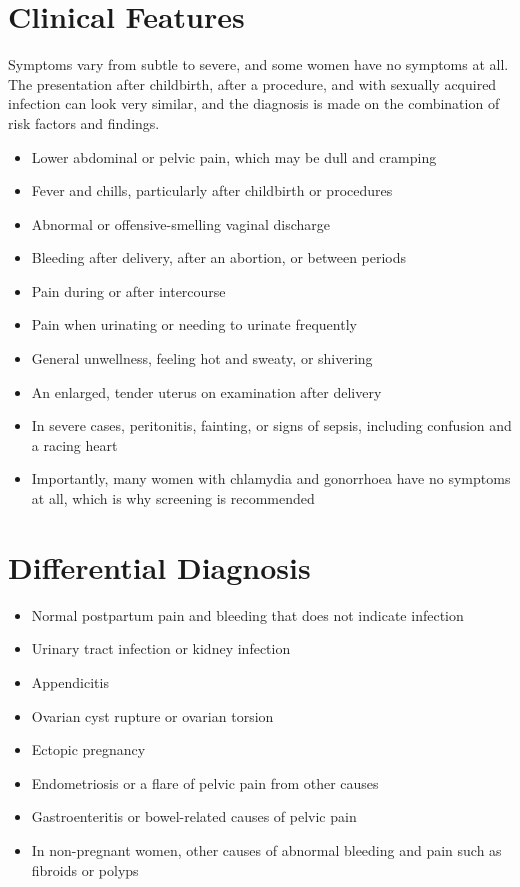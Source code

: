 \section*{Clinical Features}
Symptoms vary from subtle to severe, and some women have no symptoms at all. The presentation after childbirth, after a procedure, and with sexually acquired infection can look very similar, and the diagnosis is made on the combination of risk factors and findings.

\begin{itemize}
    \item Lower abdominal or pelvic pain, which may be dull and cramping
    \item Fever and chills, particularly after childbirth or procedures
    \item Abnormal or offensive-smelling vaginal discharge
    \item Bleeding after delivery, after an abortion, or between periods
    \item Pain during or after intercourse
    \item Pain when urinating or needing to urinate frequently
    \item General unwellness, feeling hot and sweaty, or shivering
    \item An enlarged, tender uterus on examination after delivery
    \item In severe cases, peritonitis, fainting, or signs of sepsis, including confusion and a racing heart
    \item Importantly, many women with chlamydia and gonorrhoea have no symptoms at all, which is why screening is recommended
\end{itemize}

\section*{Differential Diagnosis}
\begin{itemize}
    \item Normal postpartum pain and bleeding that does not indicate infection
    \item Urinary tract infection or kidney infection
    \item Appendicitis
    \item Ovarian cyst rupture or ovarian torsion
    \item Ectopic pregnancy
    \item Endometriosis or a flare of pelvic pain from other causes
    \item Gastroenteritis or bowel-related causes of pelvic pain
    \item In non-pregnant women, other causes of abnormal bleeding and pain such as fibroids or polyps
\end{itemize}

